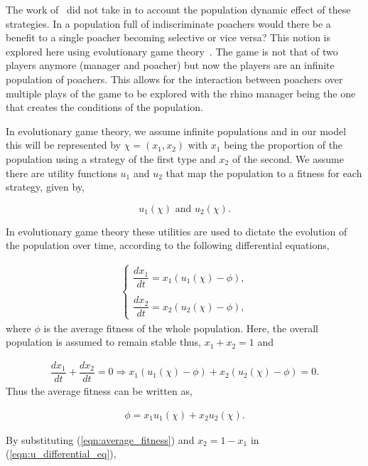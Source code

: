 \documentclass[10pt]{article}
\begin{document}
The work of~\cite{Lee} did not take in to account the population dynamic effect
of these strategies. In a population full of indiscriminate poachers would there
be a benefit to a single poacher becoming selective or vice versa? This notion
is explored here using evolutionary game theory~\cite{Smith}. The
game is not that of two players anymore (manager and poacher) but now the players
are an infinite population of poachers. This allows for the interaction between
poachers over multiple plays of the game to be explored with the rhino manager
being the one that creates the conditions of the population.

In evolutionary game theory, we assume infinite populations and in our
model this will be represented by \(\chi=(x_1, x_2)\) with \(x_1\) being the proportion
of the population using a strategy of the first type and \(x_2\) of the second. We
assume there are utility functions \(u_1\) and \(u_2\) that map the population
to a fitness for each strategy, given by,

\[ u_1(\chi)  \text{ and } u_2(\chi).\] 

In evolutionary game theory these utilities are used to dictate the evolution of
the population over time, according to the following differential equations,

\begin{eqnarray}
    \label{eqn:u_differential_eq}
    \left\{
    \begin{array}{cl}
    \dfrac{dx_1}{dt}=x_1(u_1(\chi)-\phi),
    \\
    \\
    \dfrac{dx_2}{dt}= x_2(u_2(\chi)-\phi),
    \end{array} \right.
\end{eqnarray}
where \(\phi\) is the average fitness of the whole population. Here, the overall
population is assumed to remain stable thus, \(x_1 + x_2 = 1 \) and

\begin{eqnarray}
    \dfrac{dx_1}{dt}  + \dfrac{dx_2}{dt} = 0 \Rightarrow x_1(u_1(\chi) - \phi)
     + x_2(u_2(\chi) - \phi)=0.
\end{eqnarray} 
Thus the average fitness can be written as,

\begin{eqnarray}
\label{eqn:average_fitness}
    \phi=x_1u_1(\chi) + x_2u_2(\chi).
\end{eqnarray}

By substituting (\ref{eqn:average_fitness}) and \(x_2= 1 - x_1\) 
in (\ref{eqn:u_differential_eq}),
\end{document}
